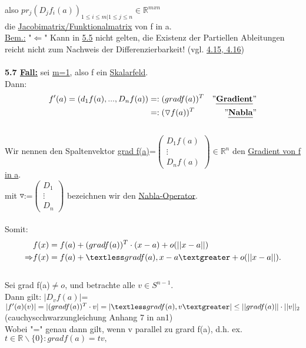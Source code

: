 \documentclass[]{scrartcl}
\begin{document}
	also $pr_j(D_jf_i(a))_{1\leq i\leq m|1\leq j\leq n}\in\mathbb{R}^{m x n}$\\
	die \ul{Jacobimatrix/Funktionalmatrix} von f in a.\\
	\underline{Bem.:} "$\Leftarrow$" Kann in \ul{5.5} nicht gelten, die Existenz der Partiellen Ableitungen reicht nicht zum Nachweis der Differenzierbarkeit! (vgl. \ul{4.15, 4.16})\\
	\\
	\textbf{5.7 \underline{Fall:}} sei \underline{\underline{m=1}}, also f ein \underline{Skalarfeld}.\\
	Dann: \begin{align}
		f'(a)=(d_1f(a),...,D_nf(a))&=:(grad f(a))^T &"\ul{\textbf{Gradient}}"\\
		&=:(\triangledown f(a))^T &"\ul{\textbf{Nabla}}"
	\end{align}\\
	Wir nennen den Spaltenvektor  \ul{grad f(a)}=$\begin{pmatrix}
		D_1f(a)\\\vdots\\D_nf(a)
	\end{pmatrix} \in \mathbb{R}^n$ den \ul{Gradient von f in a}.\\
	 mit \ul{$\triangledown$}:=$\begin{pmatrix}
		D_1\\\vdots\\D_n
	\end{pmatrix}$ bezeichnen wir den \ul{Nabla-Operator}.\\
	\\
	Somit:\begin{align}
		&f(x)=f(a)+(grad f(a))^T\cdot(x-a)+o(||x-a||)\\
		\Rightarrow &f(x)=f(a)+\textless grad f(a), x-a\textgreater + o(||x-a||).
	\end{align}\\
	Sei grad f(a)$\neq o$, und betrachte alle $v\in S^{n-1}$.\\
	Dann gilt: \ul{$|D_vf(a)|$}=$|f'(a)(v)|=|(grad f(a))^T\cdot v|\\
	=|\textless grad f(a),v\textgreater|\leq ||grad f(a)||\cdot ||v||_2$ (cauchyscchwarzungleichung Anhang 7 in an1)\\
	Wobei "=" genau dann gilt, wenn v parallel zu grard f(a), d.h. ex. $t\in\mathbb{R}\backslash\{0\}: grad f(a)=tv,$\\
\end{document}
